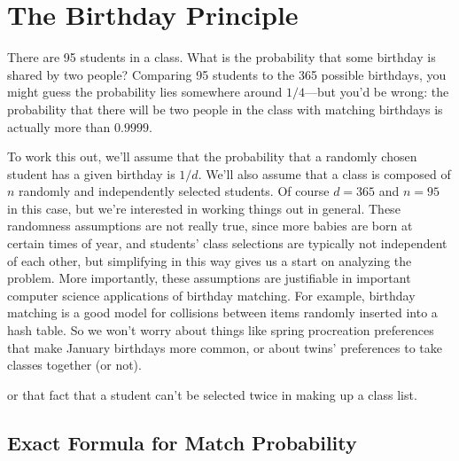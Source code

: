 \section{The Birthday Principle}\label{birthday_principle_sec}

There are 95 students in a class.  What is the probability that some
birthday is shared by two people?  Comparing 95 students to the 365
possible birthdays, you might guess the probability lies somewhere
around $1/4$---but you'd be wrong: the probability that there will be
two people in the class with matching birthdays is actually more than
$0.9999$.

To work this out, we'll assume that the probability that a randomly
chosen student has a given birthday is $1/d$.  We'll also assume that
a class is composed of $n$ randomly and independently selected
students.  Of course $d= 365$ and $n=95$ in this case, but we're
interested in working things out in general.  These randomness
assumptions are not really true, since more babies are born at certain
times of year, and students' class selections are typically not
independent of each other, but simplifying in this way gives us a
start on analyzing the problem.  More importantly, these assumptions
are justifiable in important computer science applications of birthday
matching.  For example, birthday matching is a good model for
collisions between items randomly inserted into a hash table.  So we
won't worry about things like spring procreation preferences that make
January birthdays more common, or about twins' preferences to take
classes together (or not).  \begin{editingnotes} or that fact that a
  student can't be selected twice in making up a class list.
\end{editingnotes}

\subsection{Exact Formula for Match Probability}
\iffalse The matching birthday problem fits in here so far as a nice
example illustrating pairwise and mutual independence, but t's
actually not hard to justify the bound~\eqref{bday-approx} without any
pretence of independence.
\fi


